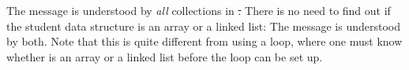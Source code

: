\documentclass[a4paper,10pt,twoside]{book}
\begin{document}
The message  is understood by \emph{all} collections in \st.
There is no need to find out if the student data structure is an array or a linked list:
The  message is understood by both.
Note that this is quite different from using a loop, where one must know whether  is an array or a linked list before the loop can be set up.


\end{document}
